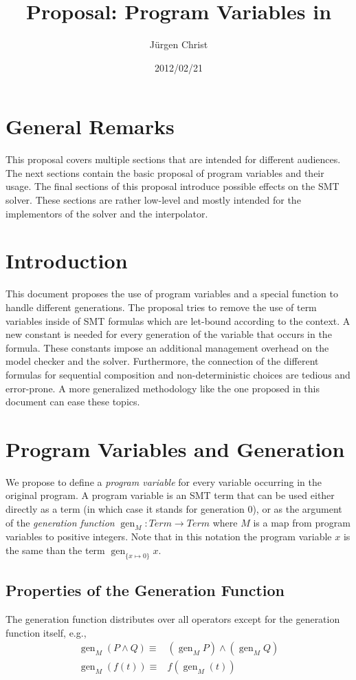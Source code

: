 \documentclass[a4paper,12pt]{article}
\title{Proposal: Program Variables in \siv}
\author{J{\"u}rgen Christ}
\date{2012/02/21}
\newcommand\gen[1]{\mathop{gen}\nolimits_{#1}}
\begin{document}
\maketitle
\section{General Remarks}
This proposal covers multiple sections that are intended for different audiences.
The next sections contain the basic proposal of program variables and their usage.
The final sections of this proposal introduce possible effects on the SMT solver.
These sections are rather low-level and mostly intended for the implementors of the solver and the interpolator.

\section{Introduction}
This document proposes the use of program variables and a special function to handle different generations.
The proposal tries to remove the use of term variables inside of SMT formulas which are let-bound according to the context.
A new constant is needed for every generation of the variable that occurs in the formula.
These constants impose an additional management overhead on the model checker and the solver.
Furthermore, the connection of the different formulas for sequential composition and non-deterministic choices are tedious and error-prone.
A more generalized methodology like the one proposed in this document can ease these topics.

\section{Program Variables and Generation}
We propose to define a \emph{program variable} for every variable occurring in the original program.
A program variable is an SMT term that can be used either directly as a term (in which case it stands for generation 0), or as the argument of the \emph{generation function} $\gen{M}: Term\rightarrow Term$ where $M$ is a map from program variables to positive integers.
Note that in this notation the program variable $x$ is the same than the term $\gen{\{x\mapsto0\}}x$.

\subsection{Properties of the Generation Function}
The generation function distributes over all operators except for the generation function itself, e.g.,
\begin{align*}
  \gen{M}(P\land Q)\equiv&(\gen{M}P)\land(\gen{M}Q)\\
  \gen{M}(f(t))\equiv&f(\gen{M}(t))
\end{align*}
\end{document}

